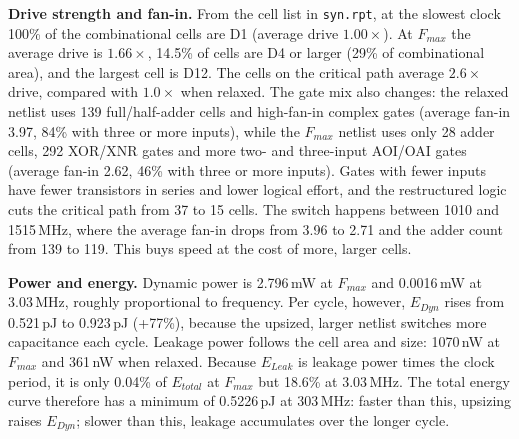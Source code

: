 \documentclass[11pt]{article}
\begin{document}
\textbf{Drive strength and fan-in.} From the cell list in \texttt{syn.rpt}, at the slowest clock 100\% of the combinational cells are D1 (average drive $1.00\times$). At $F_{max}$ the average drive is $1.66\times$, 14.5\% of cells are D4 or larger (29\% of combinational area), and the largest cell is D12. The cells on the critical path average $2.6\times$ drive, compared with $1.0\times$ when relaxed. The gate mix also changes: the relaxed netlist uses 139 full/half-adder cells and high-fan-in complex gates (average fan-in 3.97, 84\% with three or more inputs), while the $F_{max}$ netlist uses only 28 adder cells, 292 XOR/XNR gates and more two- and three-input AOI/OAI gates (average fan-in 2.62, 46\% with three or more inputs). Gates with fewer inputs have fewer transistors in series and lower logical effort, and the restructured logic cuts the critical path from 37 to 15 cells. The switch happens between 1010 and 1515\,MHz, where the average fan-in drops from 3.96 to 2.71 and the adder count from 139 to 119. This buys speed at the cost of more, larger cells.

\textbf{Power and energy.} Dynamic power is 2.796\,mW at $F_{max}$ and 0.0016\,mW at 3.03\,MHz, roughly proportional to frequency. Per cycle, however, $E_{Dyn}$ rises from 0.521\,pJ to 0.923\,pJ (+77\%), because the upsized, larger netlist switches more capacitance each cycle. Leakage power follows the cell area and size: 1070\,nW at $F_{max}$ and 361\,nW when relaxed. Because $E_{Leak}$ is leakage power times the clock period, it is only 0.04\% of $E_{total}$ at $F_{max}$ but 18.6\% at 3.03\,MHz. The total energy curve therefore has a minimum of 0.5226\,pJ at 303\,MHz: faster than this, upsizing raises $E_{Dyn}$; slower than this, leakage accumulates over the longer cycle.
\end{document}
